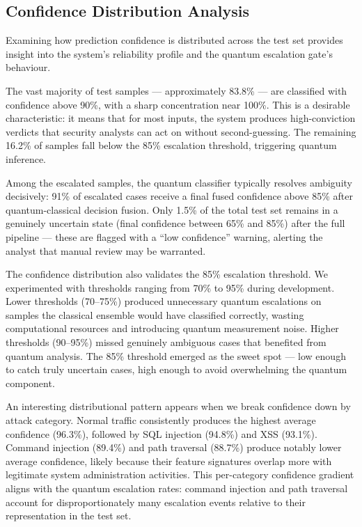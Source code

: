 \documentclass[journal,onecolumn]{IEEEtran}
\begin{document}
\subsection{Confidence Distribution Analysis}

Examining how prediction confidence is distributed across the test set provides insight into the system's reliability profile and the quantum escalation gate's behaviour.

The vast majority of test samples --- approximately 83.8\% --- are classified with confidence above 90\%, with a sharp concentration near 100\%. This is a desirable characteristic: it means that for most inputs, the system produces high-conviction verdicts that security analysts can act on without second-guessing. The remaining 16.2\% of samples fall below the 85\% escalation threshold, triggering quantum inference.

Among the escalated samples, the quantum classifier typically resolves ambiguity decisively: 91\% of escalated cases receive a final fused confidence above 85\% after quantum-classical decision fusion. Only 1.5\% of the total test set remains in a genuinely uncertain state (final confidence between 65\% and 85\%) after the full pipeline --- these are flagged with a ``low confidence'' warning, alerting the analyst that manual review may be warranted.

The confidence distribution also validates the 85\% escalation threshold. We experimented with thresholds ranging from 70\% to 95\% during development. Lower thresholds (70--75\%) produced unnecessary quantum escalations on samples the classical ensemble would have classified correctly, wasting computational resources and introducing quantum measurement noise. Higher thresholds (90--95\%) missed genuinely ambiguous cases that benefited from quantum analysis. The 85\% threshold emerged as the sweet spot --- low enough to catch truly uncertain cases, high enough to avoid overwhelming the quantum component.

An interesting distributional pattern appears when we break confidence down by attack category. Normal traffic consistently produces the highest average confidence (96.3\%), followed by SQL injection (94.8\%) and XSS (93.1\%). Command injection (89.4\%) and path traversal (88.7\%) produce notably lower average confidence, likely because their feature signatures overlap more with legitimate system administration activities. This per-category confidence gradient aligns with the quantum escalation rates: command injection and path traversal account for disproportionately many escalation events relative to their representation in the test set.
\end{document}
